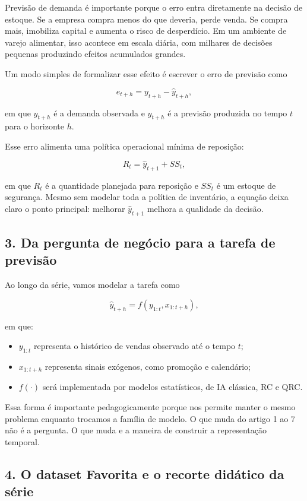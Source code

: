 \documentclass[12pt]{article}
\providecommand{\tightlist}{%
  \setlength{\itemsep}{0pt}\setlength{\parskip}{0pt}}
\begin{document}
Previsão de demanda é importante porque o erro entra diretamente na decisão de estoque. Se a empresa compra menos do que deveria, perde venda. Se compra mais, imobiliza capital e aumenta o risco de desperdício. Em um ambiente de varejo alimentar, isso acontece em escala diária, com milhares de decisões pequenas produzindo efeitos acumulados grandes.

Um modo simples de formalizar esse efeito é escrever o erro de previsão como

\[
e_{t+h} = y_{t+h} - \hat{y}_{t+h},
\]

em que \(y_{t+h}\) é a demanda observada e \(\hat{y}_{t+h}\) é a previsão produzida no tempo \(t\) para o horizonte \(h\).

Esse erro alimenta uma política operacional mínima de reposição:

\[
R_t = \hat{y}_{t+1} + SS_t,
\]

em que \(R_t\) é a quantidade planejada para reposição e \(SS_t\) é um estoque de segurança. Mesmo sem modelar toda a política de inventário, a equação deixa claro o ponto principal: melhorar \(\hat{y}_{t+1}\) melhora a qualidade da decisão.

\subsection{3. Da pergunta de negócio para a tarefa de previsão}\label{3-da-pergunta-de-neguxf3cio-para-a-tarefa-de-previsuxe3o}

Ao longo da série, vamos modelar a tarefa como

\[
\hat{y}_{t+h} = f(y_{1:t}, x_{1:t+h}),
\]

em que:

\begin{itemize}
\tightlist
\item
  \(y_{1:t}\) representa o histórico de vendas observado até o tempo \(t\);
\item
  \(x_{1:t+h}\) representa sinais exógenos, como promoção e calendário;
\item
  \(f(\cdot)\) será implementada por modelos estatísticos, de IA clássica, RC e QRC.
\end{itemize}

Essa forma é importante pedagogicamente porque nos permite manter o mesmo problema enquanto trocamos a família de modelo. O que muda do artigo 1 ao 7 não é a pergunta. O que muda e a maneira de construir a representação temporal.

\subsection{4. O dataset Favorita e o recorte didático da série}\label{4-o-dataset-favorita-e-o-recorte-diduxe1tico-da-suxe9rie}
\end{document}
